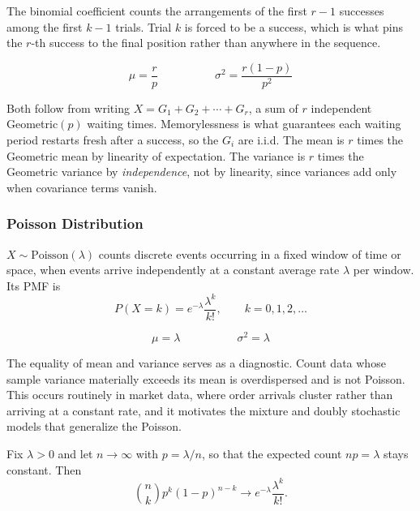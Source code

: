 The binomial coefficient counts the arrangements of the first $r-1$ successes among the first $k-1$ trials. Trial $k$ is forced to be a success, which is what pins the $r$-th success to the final position rather than anywhere in the sequence.

\[
\mu = \frac{r}{p} \hspace{5em} \sigma^2 = \frac{r(1-p)}{p^2}
\]

Both follow from writing $X = G_1 + G_2 + \cdots + G_r$, a sum of $r$ independent Geometric$(p)$ waiting times. Memorylessness is what guarantees each waiting period restarts fresh after a success, so the $G_i$ are i.i.d. The mean is $r$ times the Geometric mean by linearity of expectation. The variance is $r$ times the Geometric variance by \textit{independence}, not by linearity, since variances add only when covariance terms vanish.

\subsubsection{Poisson Distribution}

\begin{definition}[Poisson]
$X \sim \text{Poisson}(\lambda)$ counts discrete events occurring in a fixed window of time or space, when events arrive independently at a constant average rate $\lambda$ per window. Its PMF is
\[
P(X = k) = e^{-\lambda}\frac{\lambda^k}{k!}, \qquad k = 0, 1, 2, \dots
\]
\end{definition}

\[
\mu = \lambda \hspace{5em} \sigma^2 = \lambda
\]

The equality of mean and variance serves as a diagnostic. Count data whose sample variance materially exceeds its mean is overdispersed and is not Poisson. This occurs routinely in market data, where order arrivals cluster rather than arriving at a constant rate, and it motivates the mixture and doubly stochastic models that generalize the Poisson.

\begin{theorem}
Fix $\lambda > 0$ and let $n \to \infty$ with $p = \lambda/n$, so that the expected count $np = \lambda$ stays constant. Then
\[
\binom{n}{k} p^k (1-p)^{n-k} \longrightarrow e^{-\lambda}\frac{\lambda^k}{k!}.
\]
\end{theorem}

